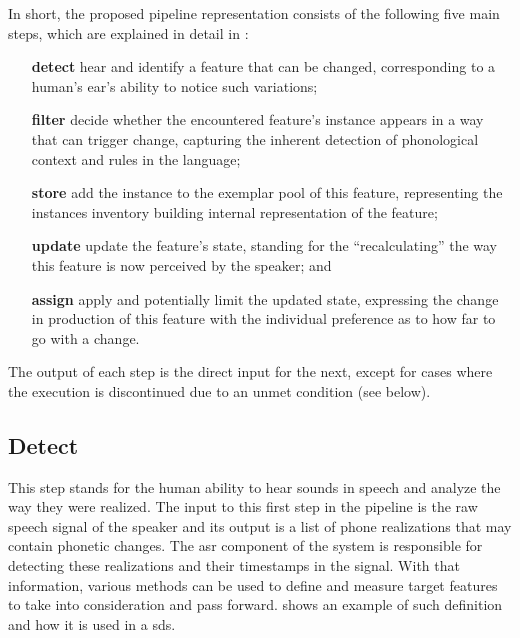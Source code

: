 In short, the proposed pipeline representation consists of the following five main steps, which are explained in detail in :
%
\begin{itemize}[topsep=0cm, itemsep=-.1cm, wide=0cm, leftmargin=!, labelwidth=]
	\item[\textbf{detect}] hear and identify a feature that can be changed, corresponding to a human's ear's ability to notice such variations;
	
	\item[\textbf{filter}] decide whether the encountered feature's instance appears in a way that can trigger change, capturing the inherent detection of phonological context and rules in the language;
	
	\item[\textbf{store}] add the instance to the exemplar pool of this feature, representing the instances inventory building internal representation of the feature;
	
	\item[\textbf{update}] update the feature's state, standing for the \enquote{recalculating} the way this feature is now perceived by the speaker; and
	
	\item[\textbf{assign}] apply and potentially limit the updated state, expressing the change in production of this feature with the individual preference as to how far to go with a change.
\end{itemize}
%
The output of each step is the direct input for the next, except for cases where the execution is discontinued due to an unmet condition (see below).

\subsection{Detect}
\label{subsec:detect}

This step stands for the human ability to hear sounds in speech and analyze the way they were realized.
The input to this first step in the pipeline is the raw speech signal of the speaker and its output is a list of phone realizations that may contain phonetic changes.
The \ac{asr} component of the system is responsible for detecting these realizations and their timestamps in the signal.
With that information, various methods can be used to define and measure target features to take into consideration and pass forward.
 shows an example of such definition and how it is used in a \ac{sds}.

